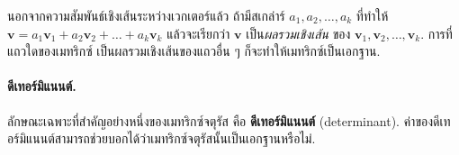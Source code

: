 นอกจากความสัมพันธ์เชิงเส้นระหว่างเวกเตอร์แล้ว 
ถ้ามีสเกล่าร์ $a_1, a_2, \ldots, a_k$ ที่ทำให้ 
$\bm{v} = a_1 \bm{v}_1 + a_2 \bm{v}_2 + \ldots + a_k \bm{v}_k$
แล้วจะเรียกว่า $\bm{v}$ เป็น\textit{ผลรวมเชิงเส้น} ของ $\bm{v}_1, \bm{v}_2, \ldots, \bm{v}_k$.
%
การที่แถวใดของเมทริกซ์
เป็นผลรวมเชิงเส้นของแถวอื่น ๆ
ก็จะทำให้เมทริกซ์เป็นเอกฐาน.
%

\paragraph{ดีเทอร์มิแนนต์.}
ลักษณะเฉพาะที่สำคัญอย่างหนึ่งของเมทริกซ์จตุรัส
คือ \textbf{ดีเทอร์มิแนนต์} (determinant).
ค่าของดีเทอร์มิแนนต์สามารถช่วยบอกได้ว่าเมทริกซ์จตุรัสนั้นเป็นเอกฐานหรือไม่.

